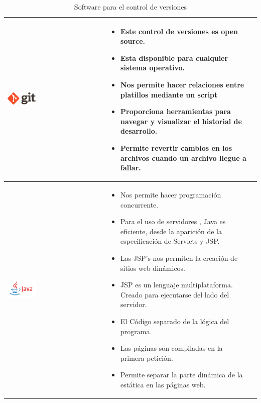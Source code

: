 \begin{table}[b!]
\begin{tabular}{|p{2cm}|ll}
          \multicolumn{1}{|p{5cm}|}{\includegraphics[width=0.3\textwidth]{images/git}} & 
          \multicolumn{1}{p{10cm}|}{
          \begin{itemize}
          \vspace{-15mm}
       \item Este control de versiones es open source.         
        \item Esta disponible para cualquier sistema operativo.
        \item Nos permite hacer relaciones entre platillos mediante un script
		\item Proporciona herramientas para navegar y visualizar el historial de desarrollo.
		\item Permite revertir cambios en los archivos cuando un archivo llegue a fallar.
      \end{itemize}} \\ 
       \hline
       \multicolumn{1}{|p{5cm}|}{\includegraphics[width=0.3\textwidth]{images/java}}& 
          \multicolumn{1}{p{10cm}|}{
          \begin{itemize}
          \vspace{-20mm}
          \item Nos permite hacer programación concurrente.
        \item Para el uso de servidores , Java es eficiente, desde la aparición de la especificación de Servlets y JSP.
        \item Las JSP's nos permiten la  creación de sitios web dinámicos.
        \item JSP es un lenguaje multiplataforma. Creado para ejecutarse del lado del servidor.
        \item El Código separado de la lógica del programa.
        \item Las páginas son compiladas en la primera petición.
        \item Permite separar la parte dinámica de la estática en las páginas web.

      \end{itemize}} \\
        \hline
      \end{tabular}
      \caption{Software para el control de versiones}
      \label{Cuadro Comparativo de software para la gestión y construcción de proyectos}
    \end{table}
\newpage
